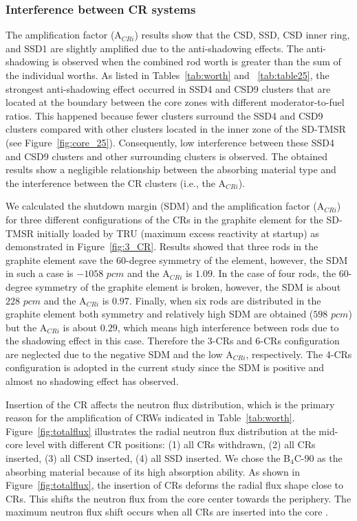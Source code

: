 \subsubsection{Interference between CR systems}

The amplification factor (A$_{CRi}$) results show that the CSD, SSD, CSD inner 
ring, and SSD1 are slightly amplified due to the anti-shadowing effects. The 
anti-shadowing is observed when the combined rod worth is greater than the sum 
of the individual worths. As listed in Tables~\ref{tab:worth} and ~\ref{tab:table25}, the strongest anti-shadowing effect occurred in 
SSD4 and CSD9 clusters that are located at the boundary between the core zones 
with different moderator-to-fuel ratios. This happened because fewer clusters surround the SSD4 and CSD9 clusters compared with other clusters located in the inner zone of the SD-TMSR (see Figure~\ref{fig:core_25}). Consequently, low interference between these SSD4 and CSD9 clusters and other surrounding clusters is observed. The obtained results show a negligible relationship between the absorbing material type and the interference between the CR clusters (i.e., the A$_{CRi}$).

We calculated the shutdown margin (SDM) and the amplification factor (A$_{CRi}$) for three different configurations of the CRs in the graphite element for the SD-TMSR initially loaded by TRU (maximum excess reactivity at startup) as demonstrated in Figure~\ref{fig:3_CR}. Results showed that three rods in the graphite element save the 60-degree symmetry of the element, however, the SDM in such a case is $-1058$ $pcm$ and the A$_{CRi}$ is $1.09$. In the case of four rods, the 60-degree symmetry of the graphite element is broken, however, the SDM is about $228$ $pcm$ and the A$_{CRi}$ is $0.97$. Finally, when six rods are distributed in the graphite element both symmetry and relatively high SDM are obtained ($598$ $pcm$) but the A$_{CRi}$ is about $0.29$, which means high interference between rods due to the shadowing effect in this case. Therefore the 3-CRs and 6-CRs configuration are neglected due to the negative SDM and the low A$_{CRi}$, respectively. The 4-CRs configuration is adopted in the current study since the SDM is positive and almost no shadowing effect has observed.

Insertion of the CR affects the neutron flux distribution, which is 
the primary reason for the amplification of CRWs indicated in 
Table~\ref{tab:worth}. Figure~\ref{fig:totalflux} illustrates the radial 
neutron flux distribution at the mid-core level with different CR positions: 
(1) all CRs withdrawn, (2) all CRs inserted, (3) all CSD inserted, (4) all SSD 
inserted. We chose the B$_4$C-90 as the absorbing material because of its high 
absorption ability. As shown in Figure~\ref{fig:totalflux}, the insertion of 
CRs deforms the radial flux shape close to CRs.
This shifts the neutron flux from the core center towards the 
periphery. The maximum neutron flux shift occurs when all CRs are inserted 
into the core \cite{girardin2007control}.

